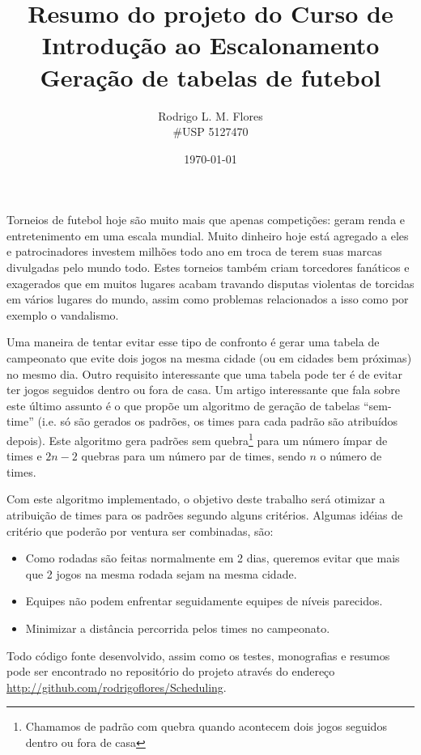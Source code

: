 \documentclass[a4paper,12pt,notitlepage]{article}
\title{Resumo do projeto do Curso de Introdução ao Escalonamento \\ Geração de tabelas de futebol}
\author{Rodrigo L. M. Flores \\ \#USP 5127470}
\date{\today}
\begin{document}
\maketitle

Torneios de futebol hoje são muito mais que apenas competições: geram renda e entretenimento em uma escala mundial. Muito dinheiro
hoje está agregado a eles e patrocinadores investem milhões todo ano em troca de terem suas marcas divulgadas pelo mundo todo. Estes
torneios também criam torcedores fanáticos e exagerados que em muitos lugares acabam travando disputas violentas de torcidas em vários 
lugares do mundo, assim como problemas relacionados a isso como por exemplo o vandalismo.

Uma maneira de tentar evitar esse tipo de confronto é gerar uma tabela de campeonato que evite
dois jogos na mesma cidade (ou em cidades bem próximas) no mesmo dia. Outro requisito interessante que uma tabela pode ter é de evitar
ter jogos seguidos dentro ou fora de casa. Um artigo interessante que fala sobre este último assunto é o %
que propõe um algoritmo de geração de tabelas ``sem-time'' (i.e. só são gerados os padrões, os times para cada padrão 
são atribuídos depois). Este algoritmo gera padrões sem quebra\footnote{Chamamos de padrão com quebra quando acontecem dois jogos seguidos
dentro ou fora de casa} para um número ímpar de times e $2n - 2$ quebras para um número par de times, sendo $n$ o número de times.

Com este algoritmo implementado, o objetivo deste trabalho será otimizar a atribuição de times para os padrões segundo alguns critérios. 
Algumas idéias de critério que poderão por ventura ser combinadas, são:

\begin{itemize}
	\item Como rodadas são feitas normalmente em 2 dias, queremos evitar que mais que 2 jogos na mesma rodada sejam na mesma cidade. 
	\item Equipes não podem enfrentar seguidamente equipes de níveis parecidos. 
	\item Minimizar a distância percorrida pelos times no campeonato.
\end{itemize}

Todo código fonte desenvolvido, assim como os testes, monografias e resumos 
pode ser encontrado no repositório do projeto através do endereço \url{http://github.com/rodrigoflores/Scheduling}.
\end{document}
